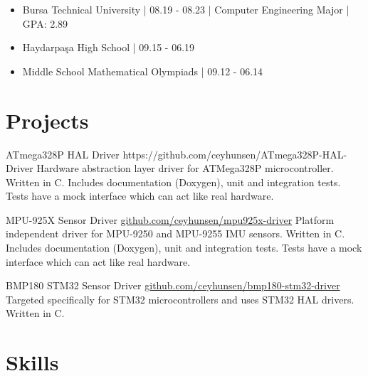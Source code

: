 \documentclass[10pt]{brutalist}
\begin{document}
\begin{itemize}
	\item Bursa Technical University | 08.19 - 08.23 | Computer Engineering Major | GPA: 2.89
	\item Haydarpaşa High School | 09.15 - 06.19
	\item Middle School Mathematical Olympiads | 09.12 - 06.14
\end{itemize}

\section*{Projects}

\projectbox
{ATmega328P HAL Driver}
{https://github.com/ceyhunsen/ATmega328P-HAL-Driver}
{
	Hardware abstraction layer driver for ATMega328P microcontroller. Written in C. Includes documentation (Doxygen), unit and integration tests. Tests have a mock interface which can act like real hardware.
}

\projectbox
{MPU-925X Sensor Driver}
{\href{https://github.com/ceyhunsen/mpu925x-driver}{github.com/ceyhunsen/mpu925x-driver}}
{
	Platform independent driver for MPU-9250 and MPU-9255 IMU sensors. Written in C. Includes documentation (Doxygen), unit and integration tests. Tests have a mock interface which can act like real hardware.
}

\projectbox
{BMP180 STM32 Sensor Driver}
{\href{https://github.com/ceyhunsen/bmp180-stm32-driver}{github.com/ceyhunsen/bmp180-stm32-driver}}
{
	Targeted specifically for STM32 microcontrollers and uses STM32 HAL drivers. Written in C.
}

\section*{Skills}
\end{document}
